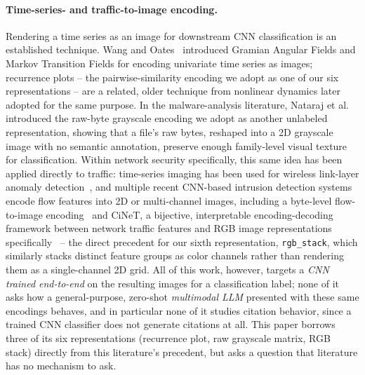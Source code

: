 \documentclass[twocolumn]{svjour3}
\begin{document}
\paragraph{Time-series- and traffic-to-image encoding.} Rendering a time series as an image for
downstream CNN classification is an established technique. Wang and Oates~\cite{wang2015gaf}
introduced Gramian Angular Fields and Markov Transition Fields for encoding univariate time series
as images; recurrence plots -- the pairwise-similarity encoding we adopt as one of our six
representations -- are a related, older technique from nonlinear dynamics later adopted for the
same purpose. In the malware-analysis literature, Nataraj et al.~\cite{nataraj2011malware}
introduced the raw-byte grayscale encoding we adopt as another unlabeled representation, showing
that a file's raw bytes, reshaped into a 2D grayscale image with no semantic annotation, preserve
enough family-level visual texture for classification. Within network security specifically, this
same idea has been applied directly to traffic: time-series imaging has been used for wireless
link-layer anomaly detection~\cite{wirelessimaging2021}, and multiple recent CNN-based intrusion
detection systems encode flow features into 2D or multi-channel images, including a byte-level
flow-to-image encoding~\cite{byteflow2026} and CiNeT, a bijective, interpretable
encoding-decoding framework between network traffic features and RGB image representations
specifically~\cite{bijective2025} -- the direct precedent for our sixth representation,
\texttt{rgb\_stack}, which similarly stacks distinct feature groups as color channels rather than
rendering them as a single-channel 2D grid. All of this work, however, targets a \emph{CNN trained
end-to-end} on the resulting images for a classification label; none of it asks how a
general-purpose, zero-shot \emph{multimodal LLM} presented with these same encodings behaves, and
in particular none of it studies citation behavior, since a trained CNN classifier does not
generate citations at all. This paper borrows three of its six representations (recurrence plot,
raw grayscale matrix, RGB stack) directly from this literature's precedent, but asks a question
that literature has no mechanism to ask.
\end{document}

